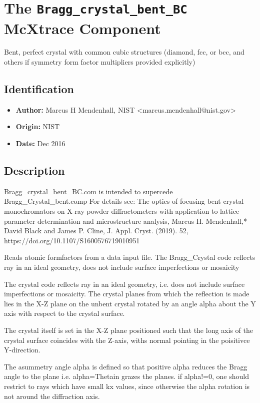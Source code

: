 \section{The \texttt{Bragg\_crystal\_bent\_BC} McXtrace Component}
Bent, perfect crystal with common cubic structures (diamond, fcc, or bcc, and others if symmetry form factor multipliers provided explicitly)

\subsection*{Identification}
\begin{itemize}
  \item \textbf{Author:} Marcus H Mendenhall, NIST \textless{}marcus.mendenhall@nist.gov\textgreater{}
  \item \textbf{Origin:} NIST
  \item \textbf{Date:} Dec 2016
\end{itemize}

\subsection*{Description}
Bragg\_crystal\_bent\_BC.com is intended to supercede Bragg\_Crystal\_bent.comp For details see: The optics of focusing bent-crystal monochromators on X-ray powder diffractometers with application to lattice parameter determination and microstructure analysis, Marcus H. Mendenhall,* David Black and James P. Cline, J. Appl. Cryst. (2019). 52, https://doi.org/10.1107/S1600576719010951

Reads atomic formfactors from a data input file. The Bragg\_Crystal code reflects ray in an ideal geometry, does not include surface imperfections or mosaicity

The crystal code reflects ray in an ideal geometry, i.e. does not include surface imperfections or mosaicity. The crystal planes from which the reflection is made lies in the X-Z plane on the unbent crystal rotated by an angle alpha about the Y axis with respect to the crystal surface.

The crystal itself is set in the X-Z plane positioned such that the long axis of the crystal surface coincides with the Z-axis, withs normal pointing in the poisitivce Y-direction.

The asummetry angle alpha is defined so that positive alpha reduces the Bragg angle to the plane i.e. alpha=Thetain grazes the planes. if alpha!=0, one should restrict to rays which have small kx values, since otherwise the alpha rotation is not around the diffraction axis.


